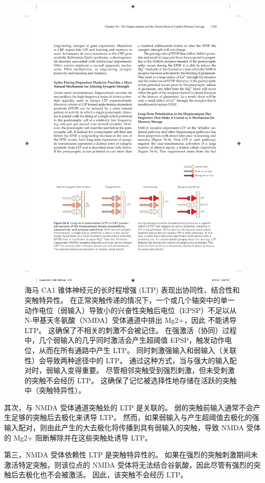 \begin{figure}[htbp]
	\centering
	\includegraphics[width=0.9\linewidth]{chap54/fig_54_6}
	\caption{海马 CA1 锥体神经元的长时程增强 (LTP) 表现出协同性、结合性和突触特异性。 在正常突触传递的情况下，一个或几个轴突中的单一动作电位（弱输入）导致小的兴奋性突触后电位（EPSP）不足以从 N-甲基天冬氨酸（NMDA）受体通道中排出 Mg2+，因此 不能诱导 LTP。 这确保了不相关的刺激不会被记住。 在强激活（协同）过程中，几个弱输入的几乎同时激活会产生超阈值 EPSP，触发动作电位，从而在所有通路中产生 LTP。 同时刺激强输入和弱输入（关联性）会导致两种途径中的 LTP。 通过这种方式，当与强大的输入配对时，弱输入变得重要。 尽管相邻突触受到强烈刺激，但未受刺激的突触不会经历 LTP。 这确保了记忆被选择性地存储在活跃的突触中（突触特异性）。}
	\label{fig:54_6}
\end{figure}


其次，与 NMDA 受体通道突触处的 LTP 是关联的。
弱的突触前输入通常不会产生足够的突触后去极化来诱导 LTP。
然而，如果弱输入与产生超阈值去极化的强输入配对，则由此产生的大去极化将传播到具有弱输入的突触，导致 NMDA 受体的 Mg2+ 阻断解除并在这些突触处诱导 LTP。


第三，NMDA 受体依赖性 LTP 是突触特异性的。
如果在强烈的突触刺激期间未激活特定突触，则该位点的 NMDA 受体将无法结合谷氨酸，因此尽管有强烈的突触后去极化也不会被激活。
因此，该突触不会经历 LTP。


